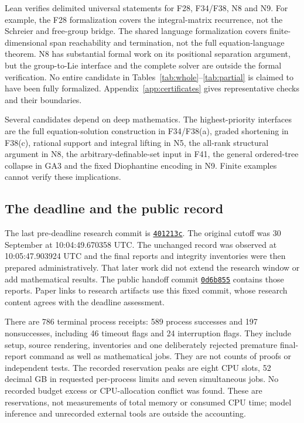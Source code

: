 Lean verifies delimited universal statements for F28, F34/F38, N8 and
N9. For example, the F28 formalization covers the integral-matrix
recurrence, not the Schreier and free-group bridge. The shared language
formalization covers finite-dimensional span reachability and termination,
not the full equation-language theorem. N8 has substantial formal work on
its positional separation argument, but the group-to-Lie interface and
the complete solver are outside the formal verification. No entire
candidate in Tables~\ref{tab:whole}--\ref{tab:partial} is claimed to have
been fully formalized. Appendix~\ref{app:certificates} gives representative
checks and their boundaries.

Several candidates depend on deep mathematics. The highest-priority
interfaces are the full equation-solution construction in F34/F38(a),
graded shortening in F38(c), rational support and integral lifting in N5,
the all-rank structural argument in N8, the arbitrary-definable-set input
in F41, the general ordered-tree collapse in GA3 and the fixed Diophantine
encoding in N9. Finite examples cannot verify these implications.

\subsection{The deadline and the public record}
The last pre-deadline research commit is
\href{https://github.com/JUrban/gworld1/tree/401213c09222ebebaf99589553258cf74a918187}{\texttt{401213c}}.
The original cutoff was 30 September at 10:04:49.670358 UTC. The unchanged
record was observed at 10:05:47.903924 UTC and the final reports and
integrity inventories were then prepared administratively. That later
work did not extend the research window or add mathematical results.
The public handoff commit
\href{https://github.com/JUrban/gworld1/tree/0d6b855fd6d9d9e5ddb5dbd186a2a590164c1341}{\texttt{0d6b855}}
contains those reports. Paper links to research artifacts use this fixed
commit, whose research content agrees with the deadline assessment.

There are 786 terminal process receipts: 589 process successes and
197 nonsuccesses, including 46 timeout flags and 24 interruption flags.
They include setup, source rendering, inventories and one deliberately
rejected premature final-report command as well as mathematical jobs.
They are not counts of proofs or independent tests. The recorded
reservation peaks are eight CPU slots, 52 decimal GB in requested
per-process limits and seven simultaneous jobs. No recorded budget
excess or CPU-allocation conflict was found. These are reservations,
not measurements of total memory or consumed CPU time; model inference
and unrecorded external tools are outside the accounting.

